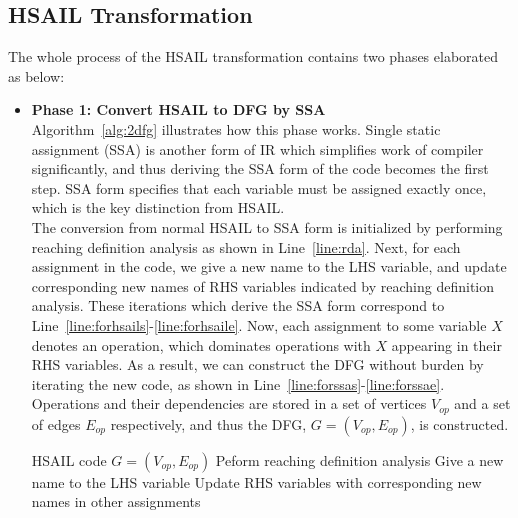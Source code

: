 \subsection{HSAIL Transformation}
\label{sec:trans}
The whole process of the HSAIL transformation contains two phases elaborated as below:
\begin{itemize}
    \item \textbf{Phase 1: Convert HSAIL to DFG by SSA} \\\indent
        Algorithm~\ref{alg:2dfg} illustrates how this phase works.
        Single static assignment (SSA) \cite{ssa} is another form of IR which simplifies work of compiler significantly, 
        and thus deriving the SSA form of the code becomes the first step.
        SSA form specifies that each variable must be assigned exactly once, which is the key distinction from HSAIL.
        \\\indent
        The conversion from normal HSAIL to SSA form is initialized by performing reaching definition analysis \cite{rda} as shown in Line~\ref{line:rda}.
        Next, for each assignment in the code, we give a new name to the LHS variable, and update corresponding new names of RHS variables indicated by reaching definition analysis.
        These iterations which derive the SSA form correspond to Line~\ref{line:forhsails}-\ref{line:forhsaile}.
        Now, each assignment to some variable $X$ denotes an operation, which dominates operations with $X$ appearing in their RHS variables.
        As a result, we can construct the DFG without burden by iterating the new code, as shown in Line~\ref{line:forssas}-\ref{line:forssae}.
        Operations and their dependencies are stored in a set of vertices $V_{op}$ and a set of edges $E_{op}$ respectively, 
        and thus the DFG, $G = ( V_{op} , E_{op} )$, is constructed.
        \begin{algorithm}[ht!]    \caption{}
            \begin{algorithmic}[1]
                \Require    HSAIL code
                \Ensure     $G = ( V_{op} , E_{op} )$   
                \State      Peform reaching definition analysis     \label{line:rda}
                     \label{line:forhsails}
                \State      Give a new name to the LHS variable
                \State      Update RHS variables with corresponding new names in other assignments
                \EndFor                                                     \label{line:forhsaile}

\end{algorithmic}
\end{algorithm}
\end{itemize}
